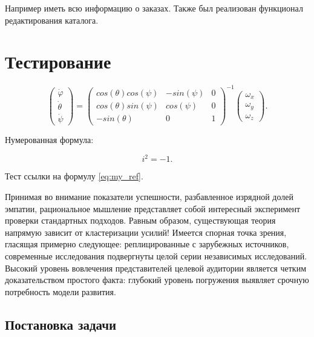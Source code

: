\documentclass[a4paper,article,14pt]{extarticle}
\begin{document}
Например иметь всю информацию о заказах.
Также был реализован функционал редактирования каталога.

\section{Тестирование}


\begin{equation}
    \begin{pmatrix} \dot{\varphi}\\ \dot{\theta} \\ \dot{\psi} \end{pmatrix}
    = \begin{pmatrix}
        cos(\theta)cos(\psi) & -sin(\psi) & 0 \\
        cos(\theta)sin(\psi) & cos(\psi)  & 0 \\
        -sin(\theta)         & 0         &  1
    \end{pmatrix}^{-1}
    \begin{pmatrix} \omega_x\\ \omega_y \\ \omega_z \end{pmatrix}.
\end{equation}

Нумерованная формула:

\begin{equation}
    i^2 = -1.
    \label{eq:my_ref}
\end{equation}

Тест ссылки на формулу \ref{eq:my_ref}.

Принимая во внимание показатели успешности, разбавленное изрядной долей эмпатии, рациональное мышление представляет собой интересный эксперимент проверки стандартных подходов. Равным образом, существующая теория напрямую зависит от кластеризации усилий! Имеется спорная точка зрения, гласящая примерно следующее: реплицированные с зарубежных источников, современные исследования подвергнуты целой серии независимых исследований. Высокий уровень вовлечения представителей целевой аудитории является четким доказательством простого факта: глубокий уровень погружения выявляет срочную потребность модели развития.

\subsection{Постановка задачи}
\end{document}
